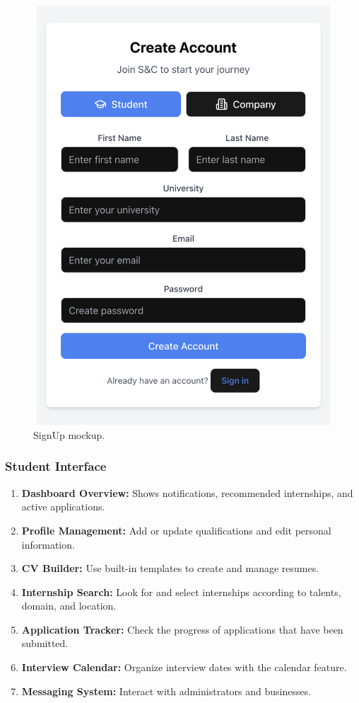 \begin{figure}[H]
\begin{minipage}{0.33\textwidth}
        \includegraphics[width=\linewidth]{JhaBhatiaSharma/Images/Mockups/SignUp.png}
        \caption{SignUp mockup.}
        \label{fig:signup_mockup}
    \end{minipage}
\end{figure}



\subsubsection{Student Interface}
\begin{enumerate}
    \item \textbf{Dashboard Overview:} Shows notifications, recommended internships, and active applications.
    \item \textbf{Profile Management:} Add or update qualifications and edit personal information.
    \item \textbf{CV Builder:} Use built-in templates to create and manage resumes.
    \item \textbf{Internship Search:} Look for and select internships according to talents, domain, and location.
    \item \textbf{Application Tracker:} Check the progress of applications that have been submitted.
    \item \textbf{Interview Calendar:} Organize interview dates with the calendar feature.
    \item \textbf{Messaging System:} Interact with administrators and businesses.
\end{enumerate}

